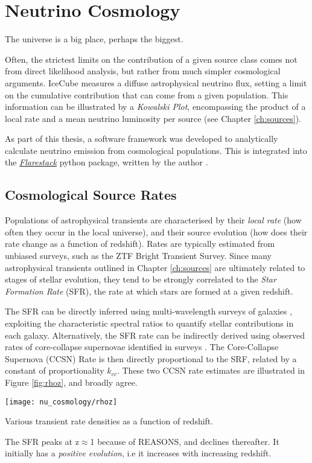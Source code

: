 \setchapterpreamble[u]{\margintoc}
\chapter{Neutrino Cosmology}
\begin{fquote}The universe is a big place, perhaps the biggest.
\end{fquote}

Often, the strictest limits on the contribution of a given source class comes not from direct likelihood analysis, but rather from much simpler cosmological arguments. IceCube measures a diffuse astrophysical neutrino flux, setting a limit on the cumulative contribution that can come from a given population. This information can be illustrated by a \emph{Kowalski Plot}, encompassing the product of a local rate and a mean neutrino luminosity per source (see Chapter \ref{ch:sources}). 

As part of this thesis, a software framework was developed to analytically calculate neutrino emission from cosmological populations. This is integrated into the \emph{\href{https://github.com/IceCubeOpenSource/flarestack}{Flarestack}} python package, written by the author .

\section{Cosmological Source Rates}

Populations of astrophysical transients are characterised by their \emph{local rate} (how often they occur in the local universe), and their source evolution (how does their rate change as a function of redshift). Rates are typically estimated from unbiased surveys, such as the ZTF Bright Transient Survey. Since many astrophysical transients outlined in Chapter \ref{ch:sources} are ultimately related to stages of stellar evolution, they tend to be strongly correlated to the \emph{Star Formation Rate} (SFR), the rate at which stars are formed at a given redshift.

The SFR can be directly inferred using multi-wavelength surveys of galaxies , exploiting the characteristic spectral ratios to quantify stellar contributions in each galaxy. Alternatively, the SFR rate can be indirectly derived using observed rates of core-collapse supernovae identified in surveys . The Core-Collapse Supernova (CCSN) Rate is then directly proportional to the SRF, related by a constant of proportionality $k_{cc}$. These two CCSN rate estimates are illustrated in Figure \ref{fig:rhoz}, and broadly agree.
\begin{marginfigure}
	\centering \texttt{[image: nu\_cosmology/rhoz]}
	\caption{Various transient rate densities as a function of redshift.}
	\label{fig:rhoz}
\end{marginfigure}
The SFR peaks at z$\approx$1 because of REASONS, and declines thereafter. It initially has a \emph{positive evolution}, i.e it increases with increasing redshift. 

